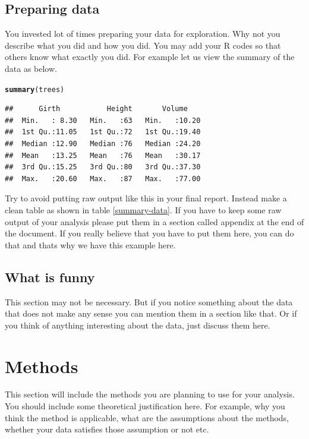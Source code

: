 \documentclass{article}\usepackage[]{graphicx}\usepackage[]{color}
\makeatletter
\newcommand{\hlstd}[1]{\textcolor[rgb]{0.345,0.345,0.345}{#1}}%
\newcommand{\hlkwd}[1]{\textcolor[rgb]{0.737,0.353,0.396}{\textbf{#1}}}%
\newenvironment{kframe}{%
 \def\at@end@of@kframe{}%
 \ifinner\ifhmode%
  \def\at@end@of@kframe{\end{minipage}}%
  \begin{minipage}{\columnwidth}%
 \fi\fi%
 \def\FrameCommand##1{\hskip\@totalleftmargin \hskip-\fboxsep
 \colorbox{shadecolor}{##1}\hskip-\fboxsep
     \hskip-\linewidth \hskip-\@totalleftmargin \hskip\columnwidth}%
 \MakeFramed {\advance\hsize-\width
   \@totalleftmargin\z@ \linewidth\hsize
   \@setminipage}}%
 {\par\unskip\endMakeFramed%
 \at@end@of@kframe}
\newenvironment{knitrout}{}{} %
\makeatother
\begin{document}
\subsection{Preparing data} You invested lot of times preparing your data for exploration. Why not you describe what you did and how you did. You may add your R codes so that others know what exactly you did. For example let us view the summary of the data as below.

\begin{knitrout}
\color{fgcolor}\begin{kframe}
\begin{alltt}
\hlkwd{summary}\hlstd{(trees)}
\end{alltt}
\begin{verbatim}
##      Girth           Height       Volume     
##  Min.   : 8.30   Min.   :63   Min.   :10.20  
##  1st Qu.:11.05   1st Qu.:72   1st Qu.:19.40  
##  Median :12.90   Median :76   Median :24.20  
##  Mean   :13.25   Mean   :76   Mean   :30.17  
##  3rd Qu.:15.25   3rd Qu.:80   3rd Qu.:37.30  
##  Max.   :20.60   Max.   :87   Max.   :77.00
\end{verbatim}
\end{kframe}
\end{knitrout}

Try to avoid putting raw output like this in your final report. Instead make a clean table as shown in table \ref{summary-data}. If you have to keep some raw output of your analysis please put them in a section called appendix at the end of the document. If you really believe that you have to put them here, you can do that and thats why we have this example here.

\subsection{What is funny} This section may not be necessary. But if you notice something  about the data that does not make any sense you can mention them in a section like that. Or if you think of anything interesting about the data, just discuss them here.

\section{Methods} This section will include the methods you are planning to use for your analysis. You should include some theoretical justification here. For example, why you think the method is applicable, what are the assumptions about the methods, whether your data satisfies those assumption or not etc. 
\end{document}
